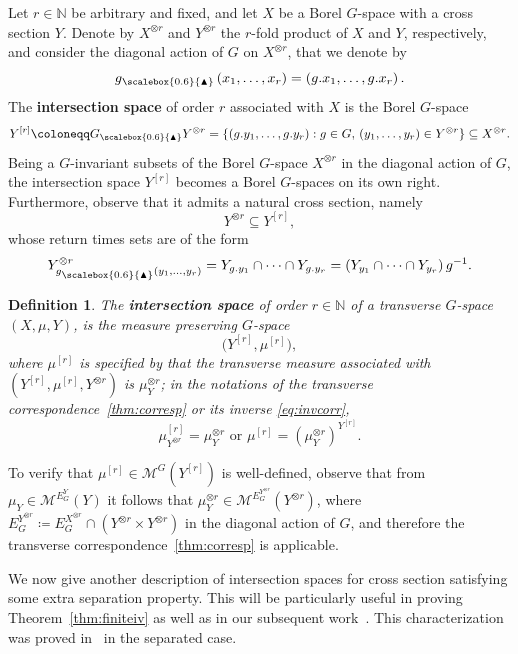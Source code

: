 \documentclass{amsart}
\numberwithin{equation}{subsection}
\newtheorem{defn}[thm]{Definition}
\theoremstyle{remark}
\newcommand{\diag}{\textsubscript{\raisebox{0.4ex}{\scalebox{0.6}{\(\blacktriangle\)}}}}\xspace
\begin{document}
Let \(r\in\mathbb{N}\) be arbitrary and fixed, and let \(X\) be a Borel \(G\)-space with a cross section \(Y\). Denote by \(X^{\otimes r}\) and \(Y^{\otimes r}\) the \(r\)-fold product of \(X\) and \(Y\), respectively, and consider the diagonal action of \(G\) on \(X^{\otimes r}\), that we denote by
\[g\diag\left(x_{1},\dotsc,x_{r}\right)=\left(g.x_{1},\dotsc,g.x_{r}\right).\]
The {\bf intersection space} of order \(r\) associated with \(X\) is the Borel \(G\)-space
\[Y^{\left[r\right]}\coloneqq G\diag Y^{\otimes r}=\{\left(g.y_{1},\dotsc,g.y_{r}\right):g\in G,\,\left(y_{1},\dotsc,y_{r}\right)\in Y^{\otimes r}\}\subseteq X^{\otimes r}.\]
Being a \(G\)-invariant subsets of the Borel \(G\)-space \(X^{\otimes r}\) in the diagonal action of \(G\), the intersection space \(Y^{\left[r\right]}\) becomes a Borel \(G\)-spaces on its own right. Furthermore, observe that it admits a natural cross section, namely
\[Y^{\otimes r}\subseteq Y^{\left[r\right]},\]
whose return times sets are of the form
\[Y_{g\diag\left(y_{1},\dotsc,y_{r}\right)}^{\otimes r}=Y_{g.y_{1}}\cap\dotsm\cap Y_{g.y_{r}}=\left(Y_{y_{1}}\cap\dotsm\cap Y_{y_{r}}\right)g^{-1}.\]

\begin{defn}\label{def:intspace1}
The {\bf intersection space} of order \(r\in\mathbb{N}\) of a transverse \(G\)-space \(\left(X,\mu,Y\right)\), is the measure preserving \(G\)-space
\[\big(Y^{\left[r\right]},\mu^{\left[r\right]}\big),\]
where \(\mu^{\left[r\right]}\) is specified by that the transverse measure associated with \(\left(Y^{\left[r\right]},\mu^{\left[r\right]},Y^{\otimes r}\right)\) is \(\mu_{Y}^{\otimes r}\); in the notations of the transverse correspondence~\ref{thm:corresp} or its inverse \eqref{eq:invcorr},
\[\mu^{\left[r\right]}_{Y^{\otimes r}}=\mu_{Y}^{\otimes r}\text{ or }\mu^{\left[r\right]}=\left(\mu_{Y}^{\otimes r}\right)^{{\scriptscriptstyle Y^{\left[r\right]}}}.\]
\end{defn}

To verify that \(\mu^{\left[r\right]}\in\mathcal{M}^{G}\left(Y^{\left[r\right]}\right)\) is well-defined, observe that from \(\mu_{Y}\in\mathcal{M}^{E_{G}^{Y}}\left(Y\right)\) it follows that \(\mu_{Y}^{\otimes r}\in\mathcal{M}^{E_{G}^{Y^{\otimes r}}}\left(Y^{\otimes r}\right)\), where \(E_{G}^{Y^{\otimes r}}\coloneqq E_{G}^{X^{\otimes r}}\cap\left(Y^{\otimes r}\times Y^{\otimes r}\right)\) in the diagonal action of \(G\), and therefore the transverse correspondence~\ref{thm:corresp} is applicable.

We now give another description of intersection spaces for cross section satisfying some extra separation property. This will be particularly useful in proving Theorem~\ref{thm:finiteiv} as well as in our subsequent work~\cite{AvBjCuII}. This characterization was proved in~\cite[\S8.3]{bjorklund2025int} in the separated case.
\end{document}
